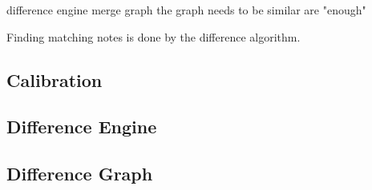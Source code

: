 


difference engine
merge graph \cite{andrews2009visual}
the graph needs to be similar are "enough"

Finding matching notes is done by the difference algorithm. 




\subsection{Calibration}
\subsection{Difference Engine}
\subsection{Difference Graph}
